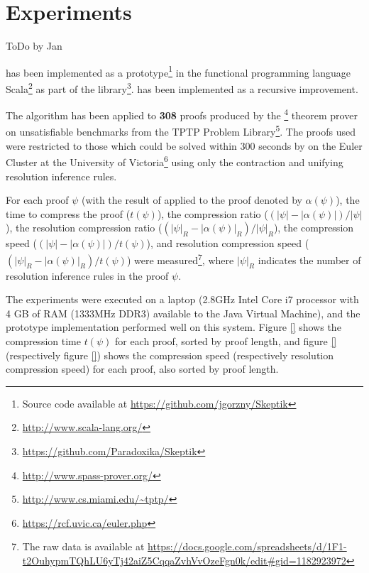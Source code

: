 
\section{Experiments} \label{sec:exp}

ToDo by Jan

{\LowerUnits} has been implemented as a prototype\footnote{Source code available at \url{https://github.com/jgorzny/Skeptik}} in the functional programming language Scala\footnote{\url{http://www.scala-lang.org/}} as part of the \skeptik
 library\footnote{\url{https://github.com/Paradoxika/Skeptik}}. {\LowerUnits} has been implemented as a
 recursive  improvement.

The algorithm has been applied to {\bf 308} proofs produced by the {\SPASS}\footnote{\url{http://www.spass-prover.org/}} theorem prover on unsatisfiable benchmarks from the TPTP Problem Library\footnote{\url{http://www.cs.miami.edu/~tptp/}}. The proofs used were restricted to those which could be solved within 300 seconds by {\SPASS} on the Euler Cluster at the University of Victoria\footnote{\url{https://rcf.uvic.ca/euler.php}} using only the contraction and unifying resolution inference rules.

For each proof $\psi$ (with the result of {\LowerUnits} applied to the proof denoted by $\alpha(\psi)$), the time to compress the proof ($t(\psi)$), the compression ratio ($(|\psi|-|\alpha(\psi)|)/|\psi|$), the resolution compression ratio  ($(|\psi|_R-|\alpha(\psi)|_R)/|\psi|_R$), the compression speed ($(|\psi|-|\alpha(\psi)|)/t(\psi)$), and resolution compression speed ($(|\psi|_R-|\alpha(\psi)|_R)/t(\psi)$) were measured\footnote{The raw data is available at \url{https://docs.google.com/spreadsheets/d/1F1-t2OuhypmTQhLU6yTj42aiZ5CqqaZvhVvOzeFgn0k/edit\#gid=1182923972}}, where $|\psi|_R$ indicates the number of resolution inference rules in the proof $\psi$.


The experiments were executed on a laptop (2.8GHz Intel Core i7 processor with 4 GB of RAM (1333MHz DDR3) available to the Java Virtual Machine), and the prototype implementation performed well on this system. Figure \ref{} shows the compression time $t(\psi)$ for each proof, sorted by proof length, and figure \ref{} (respectively figure \ref{}) shows the compression speed (respectively resolution compression speed) for each proof, also sorted by proof length.

